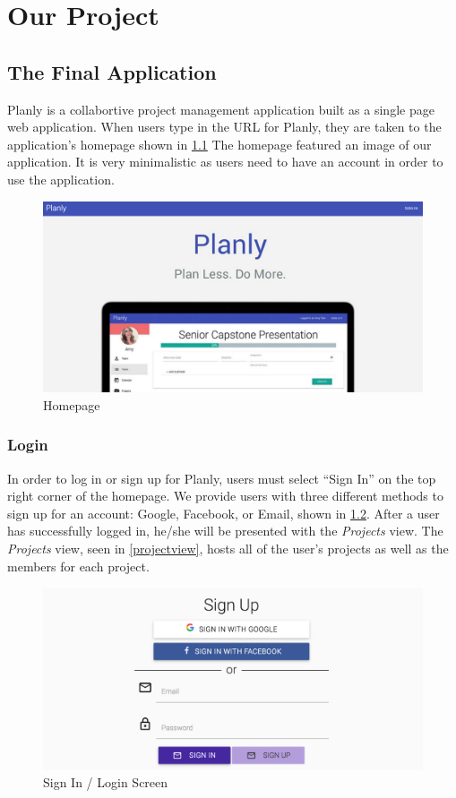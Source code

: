 \chapter{Our Project}

\section{The Final Application}
Planly is a collabortive project management application built as a single page web application. When users type in the URL for Planly, they are taken to the application's homepage shown in \ref{homepage} The homepage featured an image of our application. It is very minimalistic as users need to have an account in order to use the application.

\begin{figure}[ht]
\centering
\includegraphics[width=\textwidth]{figure41.png}
\caption{Homepage}
\label{homepage}
\end{figure}
\FloatBarrier

\subsection{Login}
In order to log in or sign up for Planly, users must select ``Sign In'' on the top right corner of the homepage. We provide users with three different methods to sign up for an account: Google, Facebook, or Email, shown in \ref{signin}. After a user has successfully logged in, he/she will be presented with the \emph{Projects} view. The \emph{Projects} view, seen in \ref{projectview}, hosts all of the user's projects as well as the members for each project. 

\begin{figure}[ht]
\centering
\includegraphics[width=\textwidth]{figure42.png}
\caption{Sign In / Login Screen}
\label{signin}
\end{figure}
\FloatBarrier


